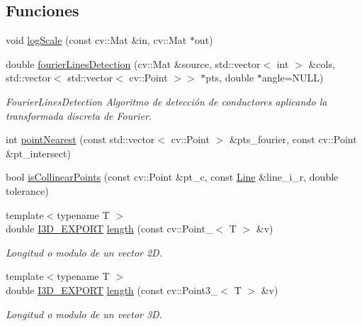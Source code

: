 \subsection*{Funciones}
\begin{DoxyCompactItemize}
\item 
void \hyperlink{namespace_i3_d_a61642b345ce36927fc6694a81d6540f7}{log\+Scale} (const cv\+::\+Mat \&in, cv\+::\+Mat $\ast$out)
\item 
double \hyperlink{namespace_i3_d_a83df44c7261ddd174a2bcdaaa6935552}{fourier\+Lines\+Detection} (cv\+::\+Mat \&source, std\+::vector$<$ int $>$ \&cols, std\+::vector$<$ std\+::vector$<$ cv\+::\+Point $>$$>$ $\ast$pts, double $\ast$angle=N\+U\+LL)
\begin{DoxyCompactList}\small\item\em Fourier\+Lines\+Detection Algoritmo de detección de conductores aplicando la transformada discreta de Fourier. \end{DoxyCompactList}\item 
int \hyperlink{group___geometric_entities_ga50289ee8c51aeff4b2f4706acbabd932}{point\+Nearest} (const std\+::vector$<$ cv\+::\+Point $>$ \&pts\+\_\+fourier, const cv\+::\+Point \&pt\+\_\+intersect)
\item 
bool \hyperlink{group___geometric_entities_gaa7aa32d175a13ad9ac23bfe016754b1f}{is\+Collinear\+Points} (const cv\+::\+Point \&pt\+\_\+c, const \hyperlink{group___geometric_entities_ga483b43891a1b33d99406fdc397e9a445}{Line} \&line\+\_\+i\+\_\+r, double tolerance)
\item 
{\footnotesize template$<$typename T $>$ }\\double \hyperlink{defs_8h_a83f373279ee1ca96b4003c673142ec1d}{I3\+D\+\_\+\+E\+X\+P\+O\+RT} \hyperlink{group___geometric_entities_ga6cfd96fd34bd41f5b201d69d70daa705}{length} (const cv\+::\+Point\+\_\+$<$ T $>$ \&v)
\begin{DoxyCompactList}\small\item\em Longitud o modulo de un vector 2D. \end{DoxyCompactList}\item 
{\footnotesize template$<$typename T $>$ }\\double \hyperlink{defs_8h_a83f373279ee1ca96b4003c673142ec1d}{I3\+D\+\_\+\+E\+X\+P\+O\+RT} \hyperlink{group___geometric_entities_gadc4e42bc957a28f97e0d45d09d5e1db7}{length} (const cv\+::\+Point3\+\_\+$<$ T $>$ \&v)
\begin{DoxyCompactList}\small\item\em Longitud o modulo de un vector 3D. \end{DoxyCompactList}\item 
$$
\end{DoxyCompactItemize}
